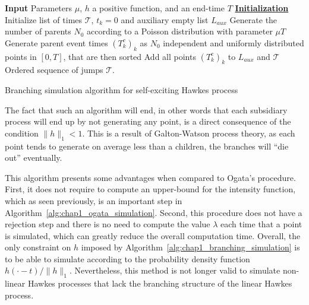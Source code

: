 \begin{algorithm}[ht]
    \SetAlgoLined
     \textbf{Input} Parameters $\mu$, $h$ a positive function, and an end-time $T$\;
     \textbf{\underline{Initialization}} Initialize list of times $\mathcal{T}$, $t_k=0$ and auxiliary empty list $L_{aux}$\;
     Generate the number of parents $N_0$ according to a Poisson distribution with parameter $\mu T$\;
     Generate parent event times $(T_k^c)_k$ as $N_0$ independent and uniformly distributed points in $[0, T]$, that are then sorted\;
     Add all points $(T_k^c)_k$ to $L_{aux}$ and $\mathcal{T}$\;
     \Return Ordered sequence of jumps $\mathcal{T}$.
     \caption{Branching simulation algorithm for self-exciting Hawkes process}
     \label{alg:chap1_branching_simulation}
    \end{algorithm}
The fact that such an algorithm will end, in other words that each subsidiary process will end up by not generating any point, is a direct consequence of the condition $\|h\|_1 < 1$.
This is a result of Galton-Watson process theory, as each point tends to generate on average less than a children, the branches will ``die out'' eventually.

This algorithm presents some advantages when compared to Ogata's procedure.
First, it does not require to compute an upper-bound for the intensity function, which as seen previously, is an important step in Algorithm~\ref{alg:chap1_ogata_simulation}.
Second, this procedure does not have a rejection step and there is no need to compute the value $\lambda$ each time that a point is simulated, which can greatly reduce the overall computation time.
Overall, the only constraint on $h$ imposed by Algorithm~\ref{alg:chap1_branching_simulation} is to be able to simulate according to the probability density function $h(\cdot - t)/\|h\|_1$.
Nevertheless, this method is not longer valid to simulate non-linear Hawkes processes that lack the branching structure of the linear Hawkes process. 
